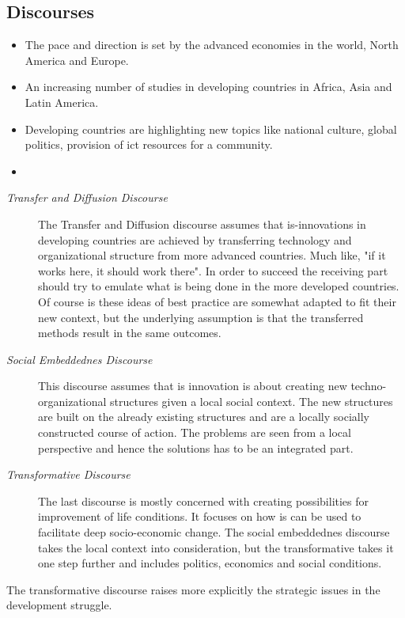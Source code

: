 \subsection{Discourses}
\label{subsec:discourses}
\begin{itemize}
\item The pace and direction is set by the advanced economies in the world, North America and Europe. \cite{ca:isdc}
\item An increasing number of studies in developing countries in Africa, Asia and Latin America.
\item Developing countries are highlighting new topics like national culture, global politics, provision of \gls{ict} resources for a community.
\item 
\end{itemize}
\begin{description}
\item[\textit{Transfer and Diffusion Discourse}]
	The Transfer and Diffusion discourse assumes that \gls{is}-innovations in developing countries are achieved by transferring technology and organizational structure from more advanced countries. Much like, "if it works here, it should work there". In order to succeed the receiving part should try to emulate what is being done in the more developed countries. Of course \gls{is} these ideas of best practice are somewhat adapted to fit their new context, but the underlying assumption is that the transferred methods result in the same outcomes.
\item[\textit{Social Embeddednes Discourse}]
	This discourse assumes that \gls{is} innovation is about creating new techno-organizational structures given a local social context. The new structures are built on the already existing structures and are a locally socially constructed course of action. The problems are seen from a local perspective and hence the solutions has to be an integrated part.
\item[\textit{Transformative Discourse}]
	The last discourse is mostly concerned with creating possibilities for improvement of life conditions. It focuses on how \gls{is} can be used to facilitate deep socio-economic change.
	The social embeddednes discourse takes the local context into consideration, but the transformative takes it one step further and includes politics, economics and social conditions. 
\end{description}

The transformative discourse raises more explicitly the strategic issues in the development struggle.


